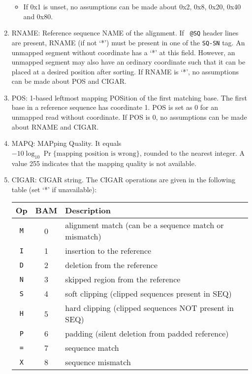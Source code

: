 \documentclass[10pt]{article}
\begin{document}
\begin{enumerate}
\begin{itemize}
  \item If 0x1 is unset, no assumptions can be made about 0x2, 0x8,
    0x20, 0x40 and 0x80.
  \end{itemize}
\item {\sf RNAME}: Reference sequence NAME of the alignment. If {\tt
    @SQ} header lines are present, {\sf RNAME} (if not `*') must be
  present in one of the {\tt SQ-SN} tag. An unmapped segment without
  coordinate has a `*' at this field. However, an unmapped segment may
  also have an ordinary coordinate such that it can be placed at a
  desired position after sorting. If {\sf RNAME} is `*', no assumptions
  can be made about {\sf POS} and {\sf CIGAR}.
\item {\sf POS}: 1-based leftmost mapping POSition of the first matching
  base. The first base in a reference sequence has coordinate 1. {\sf
    POS} is set as 0 for an unmapped read without coordinate. If {\sf
    POS} is 0, no assumptions can be made about {\sf RNAME} and {\sf
    CIGAR}.
\item {\sf MAPQ}: MAPping Quality. It equals
  $-10\log_{10}\Pr\{\mbox{mapping position is wrong}\}$, rounded to the
  nearest integer. A value 255 indicates that the mapping quality is not
  available.
\item {\sf CIGAR}: CIGAR string. The CIGAR operations are given in the
  following table (set `*' if unavailable):
  \begin{center}\small
  \begin{tabular}{ccl}
  \hline
  Op & BAM & Description\\
  \hline
  {\tt M} & 0 & alignment match (can be a sequence match or mismatch)\\
  {\tt I} & 1 & insertion to the reference \\
  {\tt D} & 2 & deletion from the reference \\
  {\tt N} & 3 & skipped region from the reference \\
  {\tt S} & 4 & soft clipping (clipped sequences present in {\sf SEQ})\\
  {\tt H} & 5 & hard clipping (clipped sequences NOT present in {\sf SEQ})\\
  {\tt P} & 6 & padding (silent deletion from padded reference)\\
  {\tt =} & 7 & sequence match \\
  {\tt X} & 8 & sequence mismatch \\
  \hline
  \end{tabular}
  \end{center}

\end{enumerate}
\end{document}
